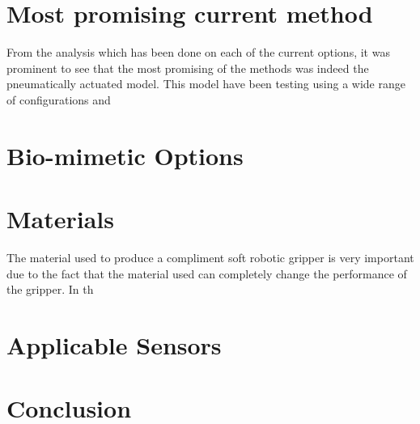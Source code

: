 \documentclass[11pt]{article}
\begin{document}
\section{Most promising current method}
From the analysis which has been done on each of the current options, it was prominent to see that the most promising of the methods was indeed the pneumatically actuated model. This model have been testing using a wide range of configurations and 
\section{Bio-mimetic Options}
\section{Materials}
The material used to produce a compliment soft robotic gripper is very important due to the fact that the material used can completely change the performance of the gripper. In th
\section{Applicable Sensors}
\section{Conclusion}


\end{document}
